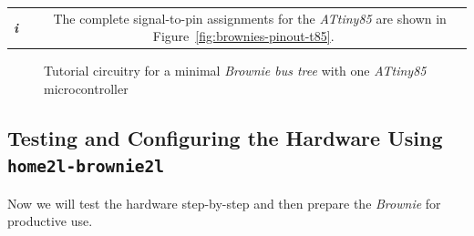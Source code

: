 \documentclass[12pt,english,parskip=half,headheight=19pt]{scrreprt}
\newcommand{\figsvg}[2][]{}            %
\newcommand{\figsvg}[2][]{\href{#2}{}} %
\newcommand{\infobox}[1]{
  \par
  \medskip
  \hfill
  \setlength\arrayrulewidth{1pt}
  \begin{tabular}[t]{c|c|}
    \parbox{1.8em}{\hfill\textit{\Huge\textbf{i}\,}}
    &
    \,\parbox{0.89\linewidth}{\setlength{\parskip}{0.5em} \small #1}\,
  \end{tabular}
  \medskip
  \par
}
\begin{document}
\infobox{
  The complete signal-to-pin assignments for the \textit{ATtiny85} are shown in
  Figure~\ref{fig:brownies-pinout-t85}.
}

\begin{figure}[ht]
  \centering
  \figsvg[inkscapearea=page]{figs/tutorial-circuit.svg}
  \caption[l]{Tutorial circuitry for a minimal \textit{Brownie bus tree} with one \textit{ATtiny85} microcontroller}
  \label{fig:tutorial-circuit}
\end{figure}



\subsection{Testing and Configuring the Hardware Using \texttt{home2l-brownie2l}}
\label{sec:tutorial-brownies-brownie2l}

Now we will test the hardware step-by-step and then prepare the \textit{Brownie} for productive use.
\end{document}
